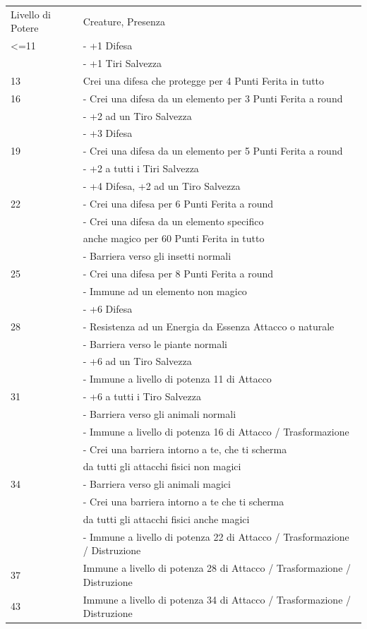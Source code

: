 \documentclass[a4paper,11pt,twoside,openany]{dndbook}
\begin{document}
\bigskip

\begin{tabular}[c]{@{}ll@{}}
\toprule 
Livello di Potere & Creature, Presenza\tabularnewline
<=11 & - +1 Difesa\\
& - +1 Tiri Salvezza \\
13 & Crei una difesa che protegge per 4 Punti Ferita in tutto \\
16 & - Crei una difesa da un elemento per 3 Punti Ferita a round \\
& - +2 ad un Tiro Salvezza\\
& - +3 Difesa\\
19 & - Crei una difesa da un elemento per 5 Punti Ferita a round\\
& - +2 a tutti i Tiri Salvezza\\
& - +4 Difesa, +2 ad un Tiro Salvezza\\
22 &- Crei una difesa per 6 Punti Ferita a round\\
& - Crei una difesa da un elemento specifico\\
&anche magico per 60 Punti Ferita in tutto\\
& - Barriera verso gli insetti normali\\
25 &- Crei una difesa per 8 Punti Ferita a round\\
&- Immune ad un elemento non magico\\
&- +6 Difesa\\
28 &- Resistenza ad un Energia da Essenza Attacco o naturale\\
&- Barriera verso le piante normali\\
&- +6 ad un Tiro Salvezza\\
&- Immune a livello di potenza 11 di Attacco\\
31 &- +6 a tutti i Tiro Salvezza\\
&- Barriera verso gli animali normali\\
&- Immune a livello di potenza 16 di Attacco / Trasformazione\\
&- Crei una barriera intorno a te, che ti scherma\\
& da tutti gli attacchi fisici non magici\\
34 &- Barriera verso gli animali magici\\
&- Crei una barriera intorno a te che ti scherma\\
&da tutti gli attacchi fisici anche magici\\
&- Immune a livello di potenza 22 di Attacco / Trasformazione / Distruzione\\
37 &Immune a livello di potenza 28 di Attacco / Trasformazione / Distruzione\\
43 &Immune a livello di potenza 34 di Attacco / Trasformazione / Distruzione\\
\bottomrule
\end{tabular}
\end{document}
